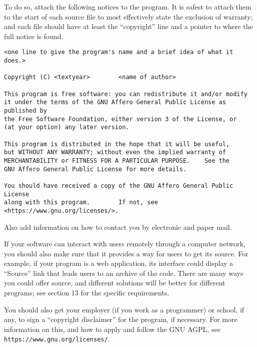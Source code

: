 \documentclass{article}%
\begin{document}
\begin{enumerate}
To do so, attach the following notices to the program.  It is safest
to attach them to the start of each source file to most effectively
state the exclusion of warranty; and each file should have at least
the ``copyright'' line and a pointer to where the full notice is found.

{\footnotesize
\begin{verbatim}
<one line to give the program's name and a brief idea of what it does.>

Copyright (C) <textyear>        <name of author>

This program is free software: you can redistribute it and/or modify
it under the terms of the GNU Affero General Public License as published by
the Free Software Foundation, either version 3 of the License, or
(at your option) any later version.

This program is distributed in the hope that it will be useful,
but WITHOUT ANY WARRANTY; without even the implied warranty of
MERCHANTABILITY or FITNESS FOR A PARTICULAR PURPOSE.    See the
GNU Affero General Public License for more details.

You should have received a copy of the GNU Affero General Public License
along with this program.        If not, see <https://www.gnu.org/licenses/>.
\end{verbatim}
}

Also add information on how to contact you by electronic and paper mail.

If your software can interact with users remotely through a computer
network, you should also make sure that it provides a way for users to
get its source.  For example, if your program is a web application, its
interface could display a ``Source'' link that leads users to an archive
of the code.    There are many ways you could offer source, and different
solutions will be better for different programs; see section 13 for the
specific requirements.

You should also get your employer (if you work as a programmer) or
school, if any, to sign a ``copyright disclaimer'' for the program, if
necessary.      For more information on this, and how to apply and follow
the GNU AGPL, see \texttt{https://www.gnu.org/licenses/}.

\end{enumerate}
\end{document}
